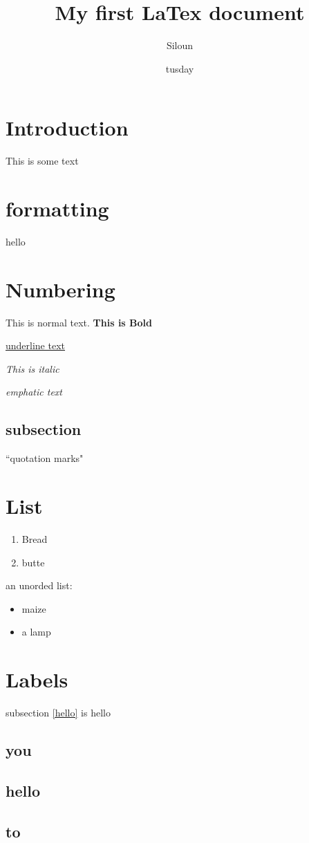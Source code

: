 \documentclass{article}
\author{Siloun}
\title{My first LaTex document}
\date{tusday}
\begin{document}
\maketitle 

\section{Introduction}
This is some text

\section{formatting}
hello

\section{Numbering}
This is normal text.  \textbf{This is Bold}

\underline{ underline text }

\textit{This is italic} 

\emph{ emphatic text}

    \subsection{subsection}

        ``quotation marks"

\section{List}

\begin{enumerate}
    \item Bread  
    \item butte
\end{enumerate}


an unorded list:

\begin{itemize}
    \item maize 
    \item a lamp
\end{itemize}


\section{Labels}
subsection \ref{hello} is hello 
    \subsection{you}
    \subsection{hello \label{hello}}
    \subsection{to}
\end{document}
